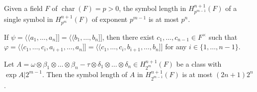 \documentclass[10pt,a4paper]{amsart}
\begin{document}
\begin{thm}\label{T3}
Given a field $F$ of $\operatorname{char}(F)=p>0$, the symbol length in $H_{p^{m-1}}^{n+1}(F)$ of a single symbol in $H_{p^m}^{n+1}(F)$ of exponent $p^{m-1}$ is at most $p^n$.
\end{thm}

\begin{cor}\label{Chain}
If $\psi=\langle \! \langle a_1,\dots,a_n ] \! ] = \langle \! \langle b_1,\dots,b_n ] \! ]$, then there exist $c_1,\dots,c_{n-1} \in F^\times$ such that
$\varphi=\langle \! \langle c_1,\dots,c_i,a_{i+1},\dots,a_n ] \! ]=\langle \! \langle c_1,\dots,c_i,b_{i+1},\dots,b_n ] \! ]$ for any $i \in \{1,\dots,n-1\}$.
\end{cor}

\begin{thm}\label{T5}
Let $A=\omega\otimes\beta_1\otimes\dots\otimes\beta_n-\tau\otimes \delta_1\otimes \dots\otimes \delta_n \in H_{2^m}^{n+1}(F)$ be a class with $\exp A|2^{m-1}$. Then the symbol length of $A$ in $H_{2^{m-1}}^{n+1}(F)$ is at most $(2n+1)2^n$. 
\end{thm}
\end{document}
